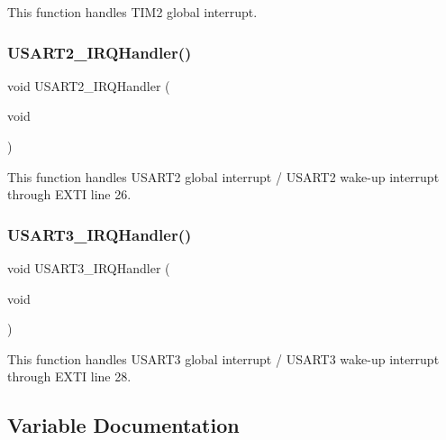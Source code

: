 This function handles T\+I\+M2 global interrupt. 

\mbox{\label{stm32f3xx__it_8c_a0ca6fd0e6f77921dd1123539857ba0a8}} 
\subsubsection{U\+S\+A\+R\+T2\+\_\+\+I\+R\+Q\+Handler()}
{\footnotesize\ttfamily void U\+S\+A\+R\+T2\+\_\+\+I\+R\+Q\+Handler (\begin{DoxyParamCaption}\item[{void}]{ }\end{DoxyParamCaption})}



This function handles U\+S\+A\+R\+T2 global interrupt / U\+S\+A\+R\+T2 wake-\/up interrupt through E\+X\+TI line 26. 

\mbox{\label{stm32f3xx__it_8c_a0d108a3468b2051548183ee5ca2158a0}} 
\subsubsection{U\+S\+A\+R\+T3\+\_\+\+I\+R\+Q\+Handler()}
{\footnotesize\ttfamily void U\+S\+A\+R\+T3\+\_\+\+I\+R\+Q\+Handler (\begin{DoxyParamCaption}\item[{void}]{ }\end{DoxyParamCaption})}



This function handles U\+S\+A\+R\+T3 global interrupt / U\+S\+A\+R\+T3 wake-\/up interrupt through E\+X\+TI line 28. 



\subsection{Variable Documentation}
\mbox{\label{stm32f3xx__it_8c_a2c80fd5510e2990a59a5c90d745c716c}} 

